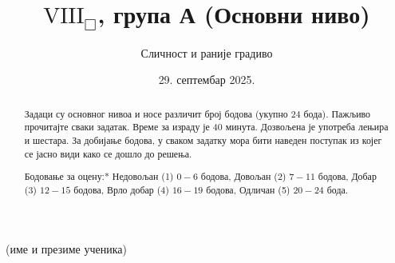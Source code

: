 \documentclass[11pt,a5paper,addpoints,noanswers]{exam}
\title{$\mathrm{VIII}_\Box$, група А (Основни ниво)}
\author{Сличност и раније градиво}
\date{29. септембар 2025.}
\begin{document}
\maketitle
\thispagestyle{headandfoot}

\begin{center} \small
 \hrulefill \par (име и презиме ученика)
\end{center}

\begin{abstract}
Задаци су основног нивоа и носе различит број бодова (укупно 24 бода). Пажљиво прочитајте сваки задатак. Време за израду је 40 минута. Дозвољена је употреба лењира и шестара.
За добијање бодова, у сваком задатку мора бити наведен поступак из којег се јасно види како се дошло до решења.

\medskip
\noindent *Бодовање за оцену:* Недовољан (1) $0 - 6$ бодова, Довољан (2) $7 - 11$ бодова, Добар (3) $12 - 15$ бодова, Врло добар (4) $16 - 19$ бодова, Одличан (5) $20 - 24$ бода.
\end{abstract}

\noindent \gradetable[h]
\end{document}
